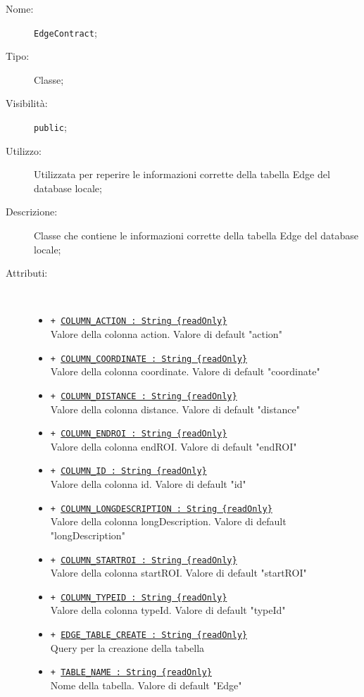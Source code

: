 \documentclass[../DefinizioneDiProdotto.tex]{subfiles}
\begin{document}
    \begin{description}
\item[Nome:] \texttt{EdgeContract};
\item[Tipo:] Classe;
\item[Visibilità:] \texttt{public};
\item[Utilizzo:] Utilizzata per reperire le informazioni corrette della tabella Edge del database locale;
\item[Descrizione:] Classe che contiene le informazioni corrette della tabella Edge del database locale;
\item[Attributi:] \
\begin{itemize}
\item \texttt{+ \underline{COLUMN\_ACTION : String \{readOnly\}}}\\
Valore della colonna action. Valore di default "action"

\item \texttt{+ \underline{COLUMN\_COORDINATE : String \{readOnly\}}}\\
Valore della colonna coordinate. Valore di default "coordinate"

\item \texttt{+ \underline{COLUMN\_DISTANCE : String \{readOnly\}}}\\
Valore della colonna distance. Valore di default "distance"

\item \texttt{+ \underline{COLUMN\_ENDROI : String \{readOnly\}}}\\
Valore della colonna endROI. Valore di default "endROI"

\item \texttt{+ \underline{COLUMN\_ID : String \{readOnly\}}}\\
Valore della colonna id. Valore di default "id"

\item \texttt{+ \underline{COLUMN\_LONGDESCRIPTION : String \{readOnly\}}}\\
Valore della colonna longDescription. Valore di default "longDescription"

\item \texttt{+ \underline{COLUMN\_STARTROI : String \{readOnly\}}}\\
Valore della colonna startROI. Valore di default "startROI"

\item \texttt{+ \underline{COLUMN\_TYPEID : String \{readOnly\}}}\\
Valore della colonna typeId. Valore di default "typeId"

\item \texttt{+ \underline{EDGE\_TABLE\_CREATE : String \{readOnly\}}}\\
Query per la creazione della tabella

\item \texttt{+ \underline{TABLE\_NAME : String \{readOnly\}}}\\
Nome della tabella. Valore di default "Edge"

\end{itemize}
\end{description}
\end{document}
